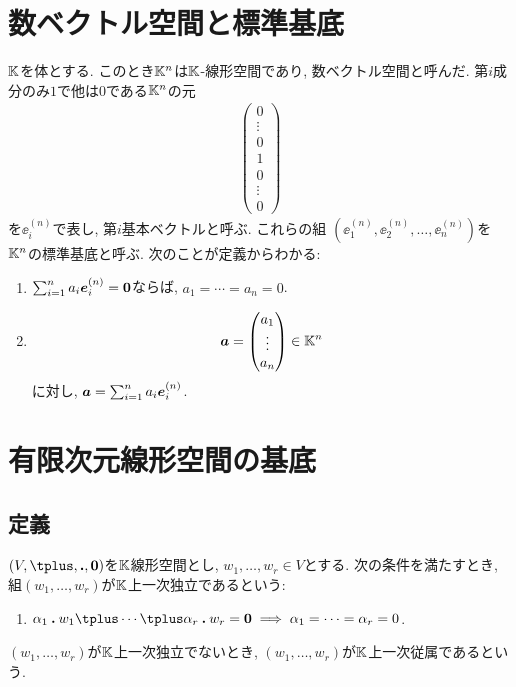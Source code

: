 \section{数ベクトル空間と標準基底}
$\mathbb{K}$を体とする.
このとき$\mathbb{K}^n$は$\mathbb{K}$-線形空間であり,
数ベクトル空間と呼んだ.
第$i$成分のみ$1$で他は$0$である$\mathbb{K}^n$の元
\begin{align*}
  \begin{pmatrix}0\\\vdots\\0\\1\\0\\\vdots\\0\end{pmatrix}
\end{align*}
を$\ee^{(n)}_i$で表し,
第$i$基本ベクトルと呼ぶ.
これらの組 $(\ee^{(n)}_1,\ee^{(n)}_2,\ldots,\ee^{(n)}_n)$を
$\mathbb{K}^n$の標準基底と呼ぶ.
次のことが定義からわかる:
\begin{enumerate}
  \item
    $\sum_{i=1}^na_i\boldsymbol{e}^{(n)}_i=\boldsymbol{0}$ならば, $a_1=\cdots=a_n=0$.
\item
    \begin{align*}
      \boldsymbol{a}=\begin{pmatrix}a_1\\\vdots\\a_n\end{pmatrix}\in\mathbb{K}^n
    \end{align*}
    に対し, $\boldsymbol{a}=\sum_{i=1}^na_i\boldsymbol{e}^{(n)}_i$.
\end{enumerate}


\section{有限次元線形空間の基底}
\subsection{定義}


\begin{definition}
  $(V,\plus,\act,\zzero)$を$\mathbb{K}$線形空間とし,
  $w_1,\ldots,w_r\in V$とする.
  次の条件を満たすとき,
  組$(w_1,\ldots,w_r)$が$\mathbb{K}$上一次独立であるという:
  \begin{enumerate}
  \item $\alpha_1\act w_1\plus\cdots\plus \alpha_r\act w_r=\zzero \implies \alpha_1=\cdots=\alpha_r=0$.
  \end{enumerate}
  $(w_1,\ldots,w_r)$が$\mathbb{K}$上一次独立でないとき,
  $(w_1,\ldots,w_r)$が$\mathbb{K}$上一次従属であるという.
\end{definition}

